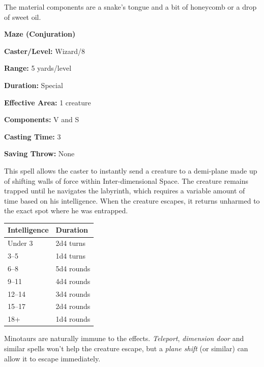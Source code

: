 \begin{multicols}{2}
The material components are a snake's tongue and a bit of honeycomb or a drop of sweet oil.

\vspace{1em}

\noindent
\begin{minipage}{\columnwidth}

\noindent \textbf{Maze (Conjuration)}

\noindent \textbf{Caster/Level:} Wizard/8

\noindent \textbf{Range:} 5 yards/level

\noindent \textbf{Duration:} Special

\noindent \textbf{Effective Area:} 1 creature

\noindent \textbf{Components:} V and S

\noindent \textbf{Casting Time:} 3

\noindent \textbf{Saving Throw:} None

\end{minipage}

This spell allows the caster to instantly send a creature to a demi-plane made up of shifting walls of force within Inter-dimensional Space.  The creature remains trapped until he navigates the labyrinth, which requires a variable amount of time based on his intelligence.  When the creature escapes, it returns unharmed to the exact spot where he was entrapped.

\noindent
\begin{tabular}{|p{}|p{}|}
\hline
Intelligence	& Duration \\
\hline\hline
\rowcolor[gray]{.9}Under 3	& 2d4 turns \\
3--5	& 1d4 turns \\
\rowcolor[gray]{.9}6--8	& 5d4 rounds \\
9--11	& 4d4 rounds \\
\rowcolor[gray]{.9}12--14	& 3d4 rounds \\
15--17	& 2d4 rounds \\
\rowcolor[gray]{.9}18+	& 1d4 rounds \\
\hline
\end{tabular}

Minotaurs are naturally immune to the effects.  \textit{Teleport}, \textit{dimension door} and similar spells won't help the creature escape, but a \textit{plane shift} (or similar) can allow it to escape immediately.
 
\vspace{1em}


\end{multicols}
